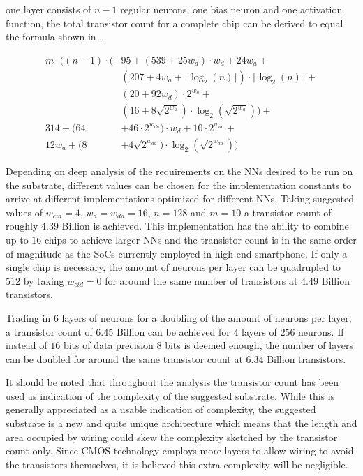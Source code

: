  one layer consists of $n - 1$ regular neurons, one bias neuron and one activation function, the total transistor count for a complete chip can be derived to equal the formula shown in .

\begin{align*}
  m \cdot \Bigg(
  (n - 1) \cdot \Big(&95 + (539 + 25w_{d}) \cdot w_{d} + 24w_{a} +\\
                     &(207 + 4w_{a} + \lceil\log_{2}(n)\rceil) \cdot \lceil\log_{2}(n)\rceil +\\
                     &(20 + 92w_{d}) \cdot 2^{w_{a}} + \\
                     &(16 + 8\sqrt{2^{w_{a}}}) \cdot \log_{2}(\sqrt{2^{w_{a}}})\Big) +\\
  314 + (64 &+ 46 \cdot 2^{w_{da}}) \cdot w_{d} + 10 \cdot 2^{w_{da}} +\\
  12w_{a} + (8 &+ 4\sqrt{2^{w_{da}}}) \cdot \log_{2}(\sqrt{2^{w_{da}}})
  \Bigg)\tag{\theequation}\label{eqn:total}
\end{align*}

Depending on deep analysis of the requirements on the \acp{NN} desired to be run on the substrate, different values can be chosen for the implementation constants to arrive at different implementations optimized for different \acp{NN}. Taking suggested values of $w_{cid} = 4$, $w_{d} = w_{da} = 16$, $n = 128$ and $m = 10$ a transistor count of roughly $4.39$ Billion is achieved. This implementation has the ability to combine up to $16$ chips to achieve larger \acp{NN} and the transistor count is in the same order of magnitude as the \acp{SoC} currently employed in high end smartphone\cite{huawei}. If only a single chip is necessary, the amount of neurons per layer can be quadrupled to $512$ by taking $w_{cid} = 0$ for around the same number of transistors at $4.49$ Billion transistors.

Trading in $6$ layers of neurons for a doubling of the amount of neurons per layer, a transistor count of $6.45$ Billion can be achieved for $4$ layers of $256$ neurons. If instead of $16$ bits of data precision $8$ bits is deemed enough, the number of layers can be doubled for around the same transistor count at $6.34$ Billion transistors.

It should be noted that throughout the analysis the transistor count has been used as indication of the complexity of the suggested substrate. While this is generally appreciated as a usable indication of complexity, the suggested substrate is a new and quite unique architecture which means that the length and area occupied by wiring could skew the complexity sketched by the transistor count only. Since \ac{CMOS} technology employs more layers to allow wiring to avoid the transistors themselves, it is believed this extra complexity will be negligible.

